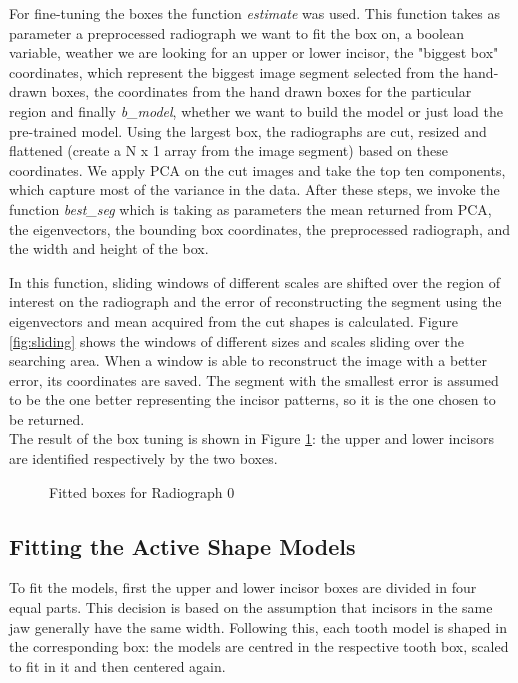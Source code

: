 \documentclass[a4paper]{article}
\begin{document}
For fine-tuning the boxes the function \textit{estimate} was used. This function takes as parameter a preprocessed radiograph we want to fit the box on, a boolean variable, weather we are looking for an upper or lower incisor, the "biggest box" coordinates, which represent the biggest image segment selected from the hand-drawn boxes, the coordinates from the hand drawn boxes for the particular region and finally \textit{b\_model}, whether we want to build the model or just load the pre-trained model. Using the largest box, the radiographs are cut, resized and flattened (create a N x 1 array from the image segment) based on these coordinates. We apply PCA on the cut images and take the top ten components, which capture most of the variance in the data. After these steps, we invoke the function \textit{best\_seg} which is taking as parameters the mean returned from PCA, the eigenvectors, the bounding box coordinates, the preprocessed radiograph, and the width and height of the box.

In this function, sliding windows of different scales are shifted over the region of interest on the radiograph and the error of reconstructing the segment using the eigenvectors and mean acquired from the cut shapes is calculated. Figure \ref{fig:sliding} shows the windows of different sizes and scales sliding over the searching area. When a window is able to reconstruct the image with a better error, its coordinates are saved. The segment with the smallest error is assumed to be the one better representing the incisor patterns, so it is the one chosen to be returned.  
\\ The result of the box tuning is shown in Figure \ref{fig:bestboxes}: the upper and lower incisors are identified respectively by the two boxes. 

\begin{figure}[h] 
    \centering
    \par\medskip
    \par\medskip        
    \caption{Fitted boxes for Radiograph 0}
    \label{fig:bestboxes}
\end{figure}

\subsection{Fitting the Active Shape Models}
To fit the models, first the upper and lower incisor boxes are divided in four equal parts. This decision is based on the assumption that incisors in the same jaw generally have the same width. Following this, each tooth model is shaped in the corresponding box: the models are centred in the respective tooth box, scaled to fit in it and then centered again. 
\end{document}

